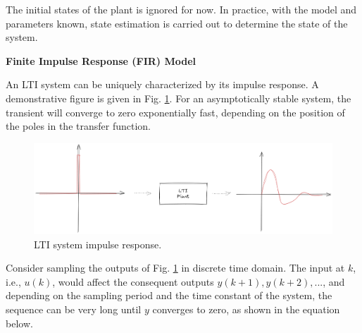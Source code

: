 The initial states of the plant is ignored for now. In practice, with the model and parameters known, state estimation is carried out to determine the state of the system.

\vspace{0.1in}
\noindent \textbf{Finite Impulse Response (FIR) Model}
\vspace{0.1in}

An LTI system can be uniquely characterized by its impulse response. A demonstrative figure is given in Fig. \ref{ch:acs:fig:fir_demo}. For an asymptotically stable system, the transient will converge to zero exponentially fast, depending on the position of the poles in the transfer function.
\begin{figure}
	\centering
	\includegraphics[width=350pt]{chapters/ch-adaptive-control-system/figures/fir_demo.png}
	\caption{LTI system impulse response.} \label{ch:acs:fig:fir_demo}
\end{figure}

Consider sampling the outputs of Fig. \ref{ch:acs:fig:fir_demo} in discrete time domain. The input at $k$, i.e., $u(k)$, would affect the consequent outputs $y(k+1), y(k+2), ...$, and depending on the sampling period and the time constant of the system, the sequence can be very long until $y$ converges to zero, as shown in the equation below.

















